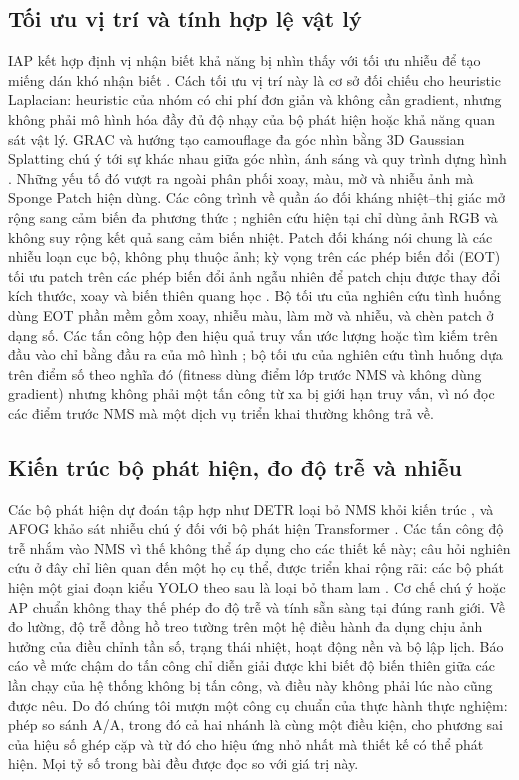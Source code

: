 \documentclass[a4paper,fleqn]{cas-dc}
\begin{document}
\subsection{Tối ưu vị trí và tính hợp lệ vật lý}
IAP kết hợp định vị nhận biết khả năng bị nhìn thấy với tối ưu nhiễu để tạo miếng dán khó nhận biết \cite{iap2025}. Cách tối ưu vị trí này là cơ sở đối chiếu cho heuristic Laplacian: heuristic của nhóm có chi phí đơn giản và không cần gradient, nhưng không phải mô hình hóa đầy đủ độ nhạy của bộ phát hiện hoặc khả năng quan sát vật lý. GRAC và hướng tạo camouflage đa góc nhìn bằng 3D Gaussian Splatting chú ý tới sự khác nhau giữa góc nhìn, ánh sáng và quy trình dựng hình \cite{grac2025,gs3dcamo2025}. Những yếu tố đó vượt ra ngoài phân phối xoay, màu, mờ và nhiễu ảnh mà Sponge Patch hiện dùng. Các công trình về quần áo đối kháng nhiệt--thị giác mở rộng sang cảm biến đa phương thức \cite{rgbt2026,thermal2026}; nghiên cứu hiện tại chỉ dùng ảnh RGB và không suy rộng kết quả sang cảm biến nhiệt. Patch đối kháng nói chung là các nhiễu loạn cục bộ, không phụ thuộc ảnh; kỳ vọng trên các phép biến đổi (EOT) tối ưu patch trên các phép biến đổi ảnh ngẫu nhiên để patch chịu được thay đổi kích thước, xoay và biến thiên quang học \cite{athalye2018eot}. Bộ tối ưu của nghiên cứu tình huống dùng EOT phần mềm gồm xoay, nhiễu màu, làm mờ và nhiễu, và chèn patch ở dạng số. Các tấn công hộp đen hiệu quả truy vấn ước lượng hoặc tìm kiếm trên đầu vào chỉ bằng đầu ra của mô hình \cite{ilyas2018blackbox}; bộ tối ưu của nghiên cứu tình huống dựa trên điểm số theo nghĩa đó (fitness dùng điểm lớp trước NMS và không dùng gradient) nhưng không phải một tấn công từ xa bị giới hạn truy vấn, vì nó đọc các điểm trước NMS mà một dịch vụ triển khai thường không trả về.

\subsection{Kiến trúc bộ phát hiện, đo độ trễ và nhiễu}
Các bộ phát hiện dự đoán tập hợp như DETR loại bỏ NMS khỏi kiến trúc \cite{carion2020detr}, và AFOG khảo sát nhiễu chú ý đối với bộ phát hiện Transformer \cite{afog2025}. Các tấn công độ trễ nhắm vào NMS vì thế không thể áp dụng cho các thiết kế này; câu hỏi nghiên cứu ở đây chỉ liên quan đến một họ cụ thể, được triển khai rộng rãi: các bộ phát hiện một giai đoạn kiểu YOLO theo sau là loại bỏ tham lam \cite{redmon2016yolo,neubeck2006nms}. Cơ chế chú ý hoặc AP chuẩn không thay thế phép đo độ trễ và tính sẵn sàng tại đúng ranh giới. Về đo lường, độ trễ đồng hồ treo tường trên một hệ điều hành đa dụng chịu ảnh hưởng của điều chỉnh tần số, trạng thái nhiệt, hoạt động nền và bộ lập lịch. Báo cáo về mức chậm do tấn công chỉ diễn giải được khi biết độ biến thiên giữa các lần chạy của hệ thống không bị tấn công, và điều này không phải lúc nào cũng được nêu. Do đó chúng tôi mượn một công cụ chuẩn của thực hành thực nghiệm: phép so sánh A/A, trong đó cả hai nhánh là cùng một điều kiện, cho phương sai của hiệu số ghép cặp và từ đó cho hiệu ứng nhỏ nhất mà thiết kế có thể phát hiện. Mọi tỷ số trong bài đều được đọc so với giá trị này.
\end{document}
